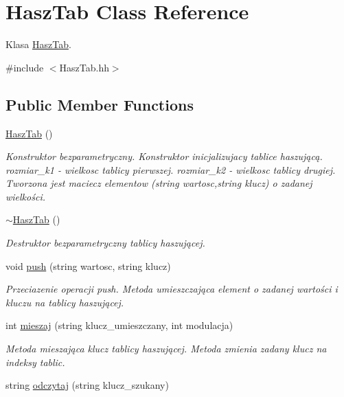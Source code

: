\hypertarget{a00003}{}\section{Hasz\+Tab Class Reference}
\label{a00003}


Klasa \hyperlink{a00003}{Hasz\+Tab}.  




{\ttfamily \#include $<$Hasz\+Tab.\+hh$>$}

\subsection*{Public Member Functions}
\begin{DoxyCompactItemize}
\item 
\hyperlink{a00003_a8c439035d939ca124f6bfdcec24d31a6}{Hasz\+Tab} ()
\begin{DoxyCompactList}\small\item\em Konstruktor bezparametryczny. Konstruktor inicjalizujacy tablice haszującą. rozmiar\+\_\+k1 -\/ wielkosc tablicy pierwszej. rozmiar\+\_\+k2 -\/ wielkosc tablicy drugiej. Tworzona jest maciecz elementow (string wartosc,string klucz) o zadanej wielkości. \end{DoxyCompactList}\item 
\hyperlink{a00003_ad2ec227290ea1e25bc5fa8a7bd6d67fa}{$\sim$\+Hasz\+Tab} ()
\begin{DoxyCompactList}\small\item\em Destruktor bezparametryczny tablicy haszującej. \end{DoxyCompactList}\item 
void \hyperlink{a00003_a6c09fe064d3e5dfe99a075ed5db2b33f}{push} (string wartosc, string klucz)
\begin{DoxyCompactList}\small\item\em Przeciazenie operacji push. Metoda umieszczająca element o zadanej wartości i kluczu na tablicy haszującej. \end{DoxyCompactList}\item 
int \hyperlink{a00003_ac30b238a4bc46128a4810f4c10d383ff}{mieszaj} (string klucz\+\_\+umieszczany, int modulacja)
\begin{DoxyCompactList}\small\item\em Metoda mieszająca klucz tablicy haszującej. Metoda zmienia zadany klucz na indeksy tablic. \end{DoxyCompactList}\item 
string \hyperlink{a00003_aad9c9ea4c22ff9c8908d85529dc2ed69}{odczytaj} (string klucz\+\_\+szukany)

\end{DoxyCompactItemize}
